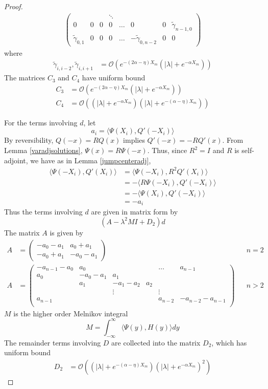 \documentclass[thesis.tex]{subfiles}
\begin{document}
\begin{lemma}
\begin{proof}
\begin{align*}
\begin{pmatrix}
&  & & \ddots  \\
0 & 0 & 0 & 0 & \dots & 0 & 0 & \tilde{\gamma}_{n-1,0} \\
\tilde{\gamma}_{0,1} & 0 & 0 & 0 & \dots & -\tilde{\gamma}_{0, n-2} & 0 & 0 
\end{pmatrix}
\end{align*}
where
\begin{align*}
\tilde{\gamma}_{i,i-2}, \tilde{\gamma}_{i,i+1} &= \mathcal{O}(e^{-(2 \alpha - \eta)X_m} (|\lambda| + e^{-\alpha X_m})) 
\end{align*}
The matrices $C_3$ and $C_4$ have uniform bound
\begin{align*}
C_3 &= \mathcal{O}(e^{-(2 \alpha - \eta)X_m} (|\lambda| + e^{-\alpha X_m})) \\
C_4 &= \mathcal{O}((|\lambda| + e^{-\alpha X_m})(|\lambda| + e^{-(\alpha - \eta) X_m}))
\end{align*}

For the terms involving $d$, let
\[
a_i = \langle \Psi(X_i), Q'(-X_i) \rangle 
\]
By reversibility, $Q(-x) = R Q(x)$ implies $Q'(-x) = -R Q'(x)$. From Lemma \ref{varadjsolutions}, $\Psi(x) = R \Psi(-x)$. Thus, since $R^2 = I$ and $R$ is self-adjoint, we have as in Lemma \ref{jumpcenteradj},
\begin{align*}
\langle \Psi(-X_i), Q'(X_i) \rangle &= \langle \Psi(-X_i), R^2 Q'(X_i) \rangle \\
&= -\langle R \Psi(-X_i), Q'(-X_i) \rangle \\
&= -\langle \Psi(X_i), Q'(-X_i) \rangle \\
&= -a_i
\end{align*}
Thus the terms involving $d$ are given in matrix form by
\[
(A - \lambda^2 M I + D_2)d
\]
The matrix $A$ is given by
\begin{align*}
A &= \begin{pmatrix}
-a_0 -a_1 & a_0 + a_1 \\
-a_0 + a_1 & -a_0 - a_1
\end{pmatrix} && n = 2 \\
A &= \begin{pmatrix}
-a_{n-1} - a_0 & a_0 & & & \dots & a_{n-1}\\
a_0 & -a_0 - a_1 &  a_1 \\
& a_1 & -a_1 - a_2 &  a_2 \\
& & \vdots & & \vdots \\
a_{n-1} & & & & a_{n-2} & -a_{n-2} - a_{n-1} \\
\end{pmatrix} && n > 2
\end{align*}
$M$ is the higher order Melnikov integral
\[
M = \int_{-\infty}^\infty \langle \Psi(y), H(y) \rangle dy
\]
The remainder terms involving $D$ are collected into the matrix $D_2$, which has uniform bound
\begin{align*}
D_2 &= \mathcal{O}((|\lambda| + e^{-(\alpha - \eta) X_m})(|\lambda| + e^{-\alpha X_m})^2)
\end{align*}
\end{proof}
\end{lemma}
\end{document}
